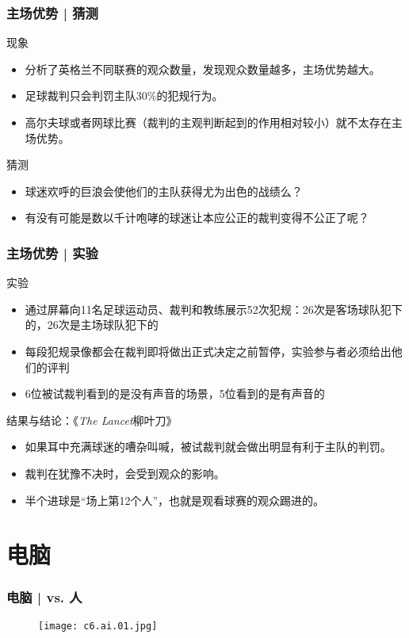 \begin{frame}
  \frametitle{主场优势 | 猜测}
  \begin{block}{现象}
    \begin{itemize}
      \item 分析了英格兰不同联赛的观众数量，发现观众数量越多，主场优势越大。
      \item 足球裁判只会判罚主队30\%的犯规行为。
      \item 高尔夫球或者网球比赛（裁判的主观判断起到的作用相对较小）就不太存在主场优势。
    \end{itemize}
  \end{block}
  \pause
  \begin{block}{猜测}
    \begin{itemize}
      \item 球迷欢呼的巨浪会使他们的主队获得尤为出色的战绩么？
      \item 有没有可能是数以千计咆哮的球迷让本应公正的裁判变得不公正了呢？
    \end{itemize}
  \end{block}
\end{frame}

\begin{frame}
  \frametitle{主场优势 | 实验}
  \begin{block}{实验}
    \begin{itemize}
      \item 通过屏幕向11名足球运动员、裁判和教练展示52次犯规：26次是客场球队犯下的，26次是主场球队犯下的
      \item 每段犯规录像都会在裁判即将做出正式决定之前暂停，实验参与者必须给出他们的评判
      \item 6位被试裁判看到的是没有声音的场景，5位看到的是有声音的
    \end{itemize}
  \end{block}
  \pause
  \begin{block}{结果与结论：《\textit{The Lancet}柳叶刀》}
    \begin{itemize}
      \item 如果耳中充满球迷的嘈杂叫喊，被试裁判就会做出明显有利于主队的判罚。
      \item 裁判在犹豫不决时，会受到观众的影响。
      \item 半个进球是“场上第12个人”，也就是观看球赛的观众踢进的。
    \end{itemize}
  \end{block}
\end{frame}

\section{电脑}
\begin{frame}
  \frametitle{电脑 | vs. 人}
  \begin{figure}
    \centering
    \texttt{[image: c6.ai.01.jpg]}
  \end{figure}
\end{frame}


